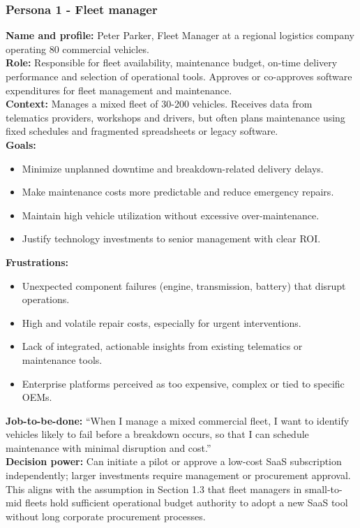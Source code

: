 \documentclass[11pt,a4paper]{article}
\begin{document}
\subsubsection{Persona 1 - Fleet manager}
\noindent \textbf{Name and profile:} Peter Parker, Fleet Manager at a regional logistics company operating 80 commercial vehicles.
\\ \noindent \textbf{Role:} Responsible for fleet availability, maintenance budget, on-time delivery performance and selection of operational tools. Approves or co-approves software expenditures for fleet management and maintenance.
\\ \noindent \textbf{Context:}  Manages a mixed fleet of 30-200 vehicles. Receives data from telematics providers, workshops and drivers, but often plans maintenance using fixed schedules and fragmented spreadsheets or legacy software.
\vspace{0.5cm}
\\\textbf{Goals:}
\begin{itemize}
    \item Minimize unplanned downtime and breakdown-related delivery delays.
    \item Make maintenance costs more predictable and reduce emergency repairs.
    \item Maintain high vehicle utilization without excessive over-maintenance.
    \item Justify technology investments to senior management with clear ROI.
\end{itemize}

\noindent \textbf{Frustrations:}
\begin{itemize}
    \item Unexpected component failures (engine, transmission, battery) that disrupt operations.
    \item High and volatile repair costs, especially for urgent interventions.
    \item Lack of integrated, actionable insights from existing telematics or maintenance tools.
    \item Enterprise platforms perceived as too expensive, complex or tied to specific OEMs.
\end{itemize}
\vspace{0.5cm}
\noindent \textbf{Job-to-be-done:} “When I manage a mixed commercial fleet, I want to identify vehicles likely to fail before a breakdown occurs, so that I can schedule maintenance with minimal disruption and cost.”
\\ \noindent \textbf{Decision power:} Can initiate a pilot or approve a low-cost SaaS subscription independently; larger investments require management or procurement approval. This aligns with the assumption in Section 1.3 that fleet managers in small-to-mid fleets hold sufficient operational budget authority to adopt a new SaaS tool without long corporate procurement processes.
\end{document}
